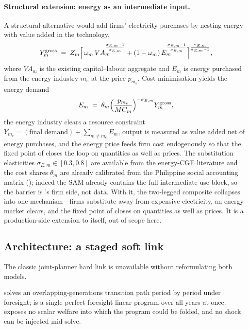 \paragraph{Structural extension: energy as an intermediate input.}
A structural alternative would add firms' electricity purchases by nesting energy with
value added in the technology,
\begin{equation}
  Y^{\text{gross}}_m
  \;=\; Z_m\Bigl[\,\omega_m\, VA_m^{\frac{\sigma_{E,m}-1}{\sigma_{E,m}}}
        + (1-\omega_m)\, E_m^{\frac{\sigma_{E,m}-1}{\sigma_{E,m}}}\Bigr]
        ^{\frac{\sigma_{E,m}}{\sigma_{E,m}-1}},
  \label{eq:routeC}
\end{equation}
where $VA_m$ is the existing capital--labour aggregate and $E_m$ is energy purchased
from the energy industry $m_e$ at the price $p_{m_e}$. Cost minimisation yields
the energy demand
\begin{equation}
  E_m \;=\; \theta_m\Bigl(\frac{p_{m_e}}{MC_m}\Bigr)^{-\sigma_{E,m}} Y^{\text{gross}}_m ,
  \label{eq:routeC-foc}
\end{equation}
the energy industry clears a resource constraint
$Y_{m_e} = (\text{final demand}) + \sum_{m\ne m_e} E_m$, output is measured as value
added net of energy purchases, and the energy price feeds firm cost endogenously so
that the fixed point of  closes the loop on quantities as well as
prices. The substitution elasticities $\sigma_{E,m}\in[0.3,0.8]$ are available from the
energy-CGE literature and the cost shares $\theta_m$ are already calibrated from the
Philippine social accounting matrix (); indeed the SAM already
contains the full intermediate-use block, so the barrier is \OGCore{}'s firm side,
not data. With it, the two-legged composite collapses into one mechanism---firms
substitute away from expensive electricity, an energy market clears, and the fixed
point of  closes on quantities as well as prices. It is a
production-side extension to \OGCore{} itself, out of scope here.

\subsection{Architecture: a staged soft link}
\label{sec:architecture}

The classic joint-planner hard link is unavailable without reformulating both models.

\begin{assumption}
\label{ass:hardlink}
\OGCore{} solves an overlapping-generations transition path period by period under
foresight; \OSeMOSYS{} is a single perfect-foresight linear program over all years at
once. \OGCore{} exposes no scalar welfare into which the program could be folded, and
no shock can be injected mid-solve.
\end{assumption}

